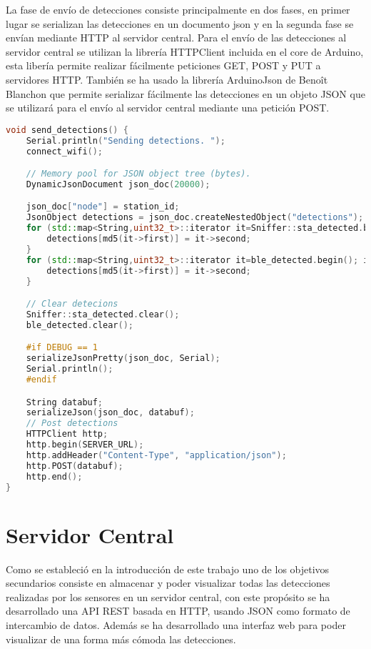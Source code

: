 \documentclass[../proyecto.tex]{subfiles}
\begin{document}
La fase de envío de detecciones consiste principalmente en dos fases, en primer lugar se serializan las detecciones en un documento json  y en la segunda fase se envían mediante HTTP al servidor central. Para el envío de las detecciones al servidor central se utilizan la librería HTTPClient incluida en el core de Arduino, esta libería permite realizar fácilmente peticiones GET, POST y PUT a servidores HTTP. También se ha usado la librería ArduinoJson de Benoît Blanchon que permite serializar fácilmente las detecciones en un objeto JSON que se utilizará para el envío al servidor central mediante una petición POST.

\begin{minipage}{\linewidth}
\begin{lstlisting}[language=C++, caption=Envío de detecciones al servidor central , captionpos=b, frame=single]
void send_detections() {
    Serial.println("Sending detections. ");
    connect_wifi();

    // Memory pool for JSON object tree (bytes).
    DynamicJsonDocument json_doc(20000);

    json_doc["node"] = station_id;
    JsonObject detections = json_doc.createNestedObject("detections");
    for (std::map<String,uint32_t>::iterator it=Sniffer::sta_detected.begin(); it!=Sniffer::sta_detected.end(); ++it) {
        detections[md5(it->first)] = it->second;
    }
    for (std::map<String,uint32_t>::iterator it=ble_detected.begin(); it!=ble_detected.end(); ++it) {
        detections[md5(it->first)] = it->second;
    }

    // Clear detecions
    Sniffer::sta_detected.clear();
    ble_detected.clear();

    #if DEBUG == 1
    serializeJsonPretty(json_doc, Serial);
    Serial.println();
    #endif

    String databuf;
    serializeJson(json_doc, databuf);
    // Post detections
    HTTPClient http;
    http.begin(SERVER_URL);
    http.addHeader("Content-Type", "application/json");
    http.POST(databuf);
    http.end();
}
\end{lstlisting}
\end{minipage}

\section{Servidor Central}

Como se estableció en la introducción de este trabajo uno de los objetivos secundarios consiste en almacenar y poder visualizar todas las detecciones realizadas por los sensores en un servidor central, con este propósito se ha desarrollado una API REST basada en HTTP, usando JSON como formato de intercambio de datos. Además se ha desarrollado una interfaz web para poder visualizar de una forma más cómoda las detecciones.\\
\end{document}
